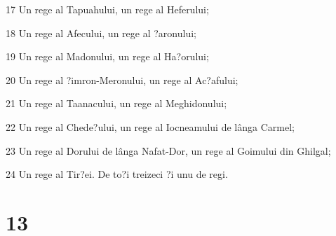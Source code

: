 \par 17 Un rege al Tapuahului, un rege al Heferului;
\par 18 Un rege al Afecului, un rege al ?aronului;
\par 19 Un rege al Madonului, un rege al Ha?orului;
\par 20 Un rege al ?imron-Meronului, un rege al Ac?afului;
\par 21 Un rege al Taanacului, un rege al Meghidonului;
\par 22 Un rege al Chede?ului, un rege al Iocneamului de lânga Carmel;
\par 23 Un rege al Dorului de lânga Nafat-Dor, un rege al Goimului din Ghilgal;
\par 24 Un rege al Tir?ei. De to?i treizeci ?i unu de regi.

\chapter{13}

